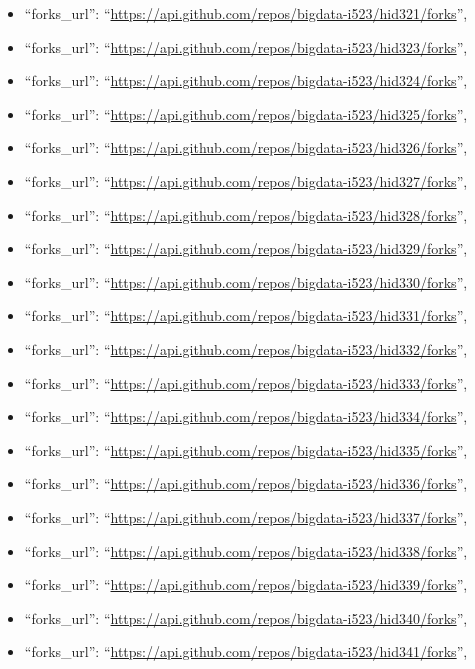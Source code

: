 \begin{itemize}
\item
  ``forks\_url'':
  ``\url{https://api.github.com/repos/bigdata-i523/hid321/forks}'',
\item
  ``forks\_url'':
  ``\url{https://api.github.com/repos/bigdata-i523/hid323/forks}'',
\item
  ``forks\_url'':
  ``\url{https://api.github.com/repos/bigdata-i523/hid324/forks}'',
\item
  ``forks\_url'':
  ``\url{https://api.github.com/repos/bigdata-i523/hid325/forks}'',
\item
  ``forks\_url'':
  ``\url{https://api.github.com/repos/bigdata-i523/hid326/forks}'',
\item
  ``forks\_url'':
  ``\url{https://api.github.com/repos/bigdata-i523/hid327/forks}'',
\item
  ``forks\_url'':
  ``\url{https://api.github.com/repos/bigdata-i523/hid328/forks}'',
\item
  ``forks\_url'':
  ``\url{https://api.github.com/repos/bigdata-i523/hid329/forks}'',
\item
  ``forks\_url'':
  ``\url{https://api.github.com/repos/bigdata-i523/hid330/forks}'',
\item
  ``forks\_url'':
  ``\url{https://api.github.com/repos/bigdata-i523/hid331/forks}'',
\item
  ``forks\_url'':
  ``\url{https://api.github.com/repos/bigdata-i523/hid332/forks}'',
\item
  ``forks\_url'':
  ``\url{https://api.github.com/repos/bigdata-i523/hid333/forks}'',
\item
  ``forks\_url'':
  ``\url{https://api.github.com/repos/bigdata-i523/hid334/forks}'',
\item
  ``forks\_url'':
  ``\url{https://api.github.com/repos/bigdata-i523/hid335/forks}'',
\item
  ``forks\_url'':
  ``\url{https://api.github.com/repos/bigdata-i523/hid336/forks}'',
\item
  ``forks\_url'':
  ``\url{https://api.github.com/repos/bigdata-i523/hid337/forks}'',
\item
  ``forks\_url'':
  ``\url{https://api.github.com/repos/bigdata-i523/hid338/forks}'',
\item
  ``forks\_url'':
  ``\url{https://api.github.com/repos/bigdata-i523/hid339/forks}'',
\item
  ``forks\_url'':
  ``\url{https://api.github.com/repos/bigdata-i523/hid340/forks}'',
\item
  ``forks\_url'':
  ``\url{https://api.github.com/repos/bigdata-i523/hid341/forks}'',

\end{itemize}
